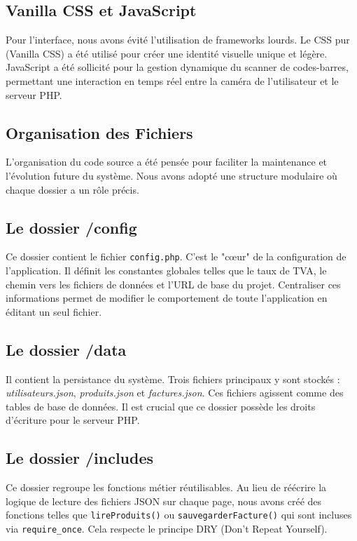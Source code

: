 \documentclass[12pt,a4paper]{report}
\begin{document}
\subsection{Vanilla CSS et JavaScript}
Pour l'interface, nous avons évité l'utilisation de frameworks lourds. Le CSS pur (Vanilla CSS) a été utilisé pour créer une identité visuelle unique et légère. JavaScript a été sollicité pour la gestion dynamique du scanner de codes-barres, permettant une interaction en temps réel entre la caméra de l'utilisateur et le serveur PHP.

\subsection{Organisation des Fichiers}
L'organisation du code source a été pensée pour faciliter la maintenance et l'évolution future du système. Nous avons adopté une structure modulaire où chaque dossier a un rôle précis.

\subsection{Le dossier /config}
Ce dossier contient le fichier \texttt{config.php}. C'est le "cœur" de la configuration de l'application. Il définit les constantes globales telles que le taux de TVA, le chemin vers les fichiers de données et l'URL de base du projet. Centraliser ces informations permet de modifier le comportement de toute l'application en éditant un seul fichier.

\subsection{Le dossier /data}
Il contient la persistance du système. Trois fichiers principaux y sont stockés : \textit{utilisateurs.json}, \textit{produits.json} et \textit{factures.json}. Ces fichiers agissent comme des tables de base de données. Il est crucial que ce dossier possède les droits d'écriture pour le serveur PHP.

\subsection{Le dossier /includes}
Ce dossier regroupe les fonctions métier réutilisables. Au lieu de réécrire la logique de lecture des fichiers JSON sur chaque page, nous avons créé des fonctions telles que \texttt{lireProduits()} ou \texttt{sauvegarderFacture()} qui sont incluses via \texttt{require\_once}. Cela respecte le principe DRY (Don't Repeat Yourself).
\end{document}

